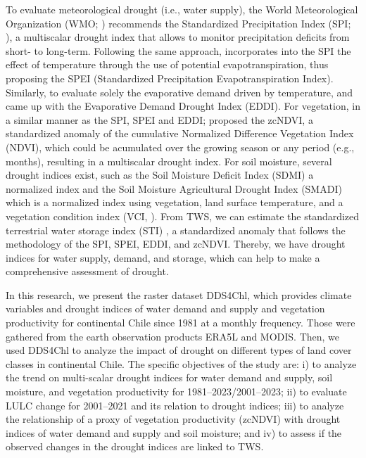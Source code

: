 \documentclass[
  authoryear,
  preprint,
  3p,
  onecolumn]{elsarticle}
\begin{document}
To evaluate meteorological drought (i.e., water supply), the World
Meteorological Organization (WMO; \citet{WMO2012}) recommends the
Standardized Precipitation Index (SPI; \citet{Mckee1993}), a multiscalar
drought index that allows to monitor precipitation deficits from short-
to long-term. Following the same approach, \citet{Vicente-Serrano2010}
incorporates into the SPI the effect of temperature through the use of
potential evapotranspiration, thus proposing the SPEI (Standardized
Precipitation Evapotranspiration Index). Similarly, to evaluate solely
the evaporative demand driven by temperature, \citet{Hobbins2016} and
\citet{McEvoy2016} came up with the Evaporative Demand Drought Index
(EDDI). For vegetation, in a similar manner as the SPI, SPEI and EDDI;
\citet{Zambrano2018} proposed the zcNDVI, a standardized anomaly of the
cumulative Normalized Difference Vegetation Index (NDVI), which could be
acumulated over the growing season or any period (e.g., months),
resulting in a multiscalar drought index. For soil moisture, several
drought indices exist, such as the Soil Moisture Deficit Index (SDMI) a
normalized index \citep{Narasimhan2005} and the Soil Moisture
Agricultural Drought Index (SMADI) \citep{Souza2021} which is a
normalized index using vegetation, land surface temperature, and a
vegetation condition index (VCI, \citep{Kogan1995}). From TWS, we can
estimate the standardized terrestrial water storage index (STI)
\citep{Cui2021}, a standardized anomaly that follows the methodology of
the SPI, SPEI, EDDI, and zcNDVI. Thereby, we have drought indices for
water supply, demand, and storage, which can help to make a
comprehensive assessment of drought.

In this research, we present the raster dataset DDS4Chl, which provides
climate variables and drought indices of water demand and supply and
vegetation productivity for continental Chile since 1981 at a monthly
frequency. Those were gathered from the earth observation products ERA5L
and MODIS. Then, we used DDS4Chl to analyze the impact of drought on
different types of land cover classes in continental Chile. The specific
objectives of the study are: i) to analyze the trend on multi-scalar
drought indices for water demand and supply, soil moisture, and
vegetation productivity for 1981--2023/2001--2023; ii) to evaluate LULC
change for 2001--2021 and its relation to drought indices; iii) to
analyze the relationship of a proxy of vegetation productivity (zcNDVI)
with drought indices of water demand and supply and soil moisture; and
iv) to assess if the observed changes in the drought indices are linked
to TWS.
\end{document}
